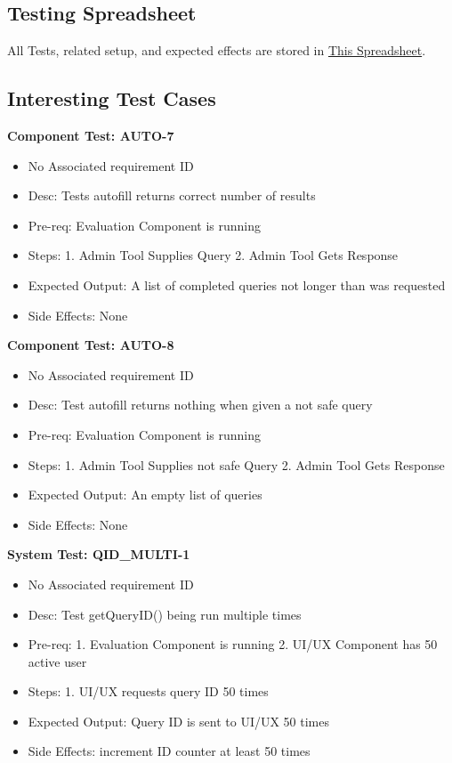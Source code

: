 \subsection*{Testing Spreadsheet}
All Tests, related setup, and expected effects are stored in \href{https://docs.google.com/spreadsheets/d/1BoIIdfYPEM98kANtgATMmwdYYAYXyrwbqOqgZ7D_9U4/edit?usp=sharing}{This Spreadsheet}.

\subsection*{Interesting Test Cases}

\textbf{Component Test: AUTO-7}
\begin{itemize}
    \item No Associated requirement ID
    \item Desc: Tests autofill returns correct number of results
    \item Pre-req: Evaluation Component is running
    \item Steps: 1. Admin Tool Supplies Query 2. Admin Tool Gets Response
    \item Expected Output: A list of completed queries not longer than was requested
    \item Side Effects: None
\end{itemize}

\smallskip

\textbf{Component Test: AUTO-8}
\begin{itemize}
    \item No Associated requirement ID
    \item Desc: Test autofill returns nothing when given a not safe query
    \item Pre-req: Evaluation Component is running
    \item Steps: 1. Admin Tool Supplies not safe Query 2. Admin Tool Gets Response
    \item Expected Output: An empty list of queries
    \item Side Effects: None
\end{itemize}

\smallskip

\textbf{System Test: QID\_MULTI-1}
\begin{itemize}
    \item No Associated requirement ID
    \item Desc: Test getQueryID() being run multiple times
    \item Pre-req: 1. Evaluation Component is running 2. UI/UX Component has 50 active user
    \item Steps: 1. UI/UX requests query ID 50 times
    \item Expected Output: Query ID is sent to UI/UX 50 times
    \item Side Effects: increment ID counter at least 50 times
\end{itemize}

